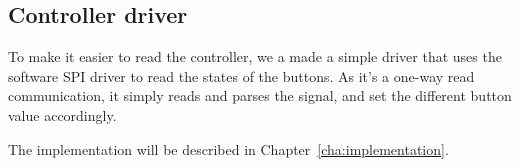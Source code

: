 \subsection{Controller driver}

To make it easier to read the controller, we a made a simple driver that uses the software SPI driver to read the states of the buttons. As it's a one-way read communication, it simply reads and parses the signal, and set the different button value accordingly.

The implementation will be described in Chapter~\ref{cha:implementation}.